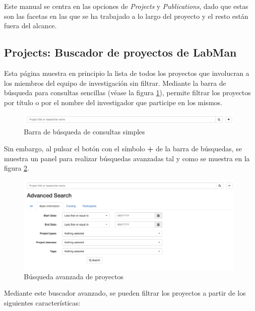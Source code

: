 Este manual se centra en las opciones de \textit{Projects} y \textit{Publications}, dado que estas son las facetas en las que se ha trabajado a lo largo del proyecto y el resto están fuera del alcance.

\subsection{Projects: Buscador de proyectos de LabMan}

Esta página muestra en principio la lista de todos los proyectos que involucran a los miembros del equipo de investigación sin filtrar. Mediante la barra de búsqueda para consultas sencillas (véase la figura \ref{fig:project_search_bar}), permite filtrar los proyectos por título o por el nombre del investigador que participe en los mismos.

\begin{figure}[!htbp]
	\centering
	\includegraphics[scale=0.35]{fig/project_search_bar}
	\caption{Barra de búsqueda de consultas simples}
	\label{fig:project_search_bar}
\end{figure}

Sin embargo, al pulsar el botón con el símbolo \textbf{+} de la barra de búsquedas, se muestra un panel para realizar búsquedas avanzadas tal y como se muestra en la figura \ref{fig:projects_advanced_search}.

\begin{figure}[!htbp]
	\centering
	\includegraphics[scale=0.31]{fig/projects_advanced_search}
	\caption{Búsqueda avanzada de proyectos}
	\label{fig:projects_advanced_search}
\end{figure}

Mediante este buscador avanzado, se pueden filtrar los proyectos a partir de los siguientes características:

